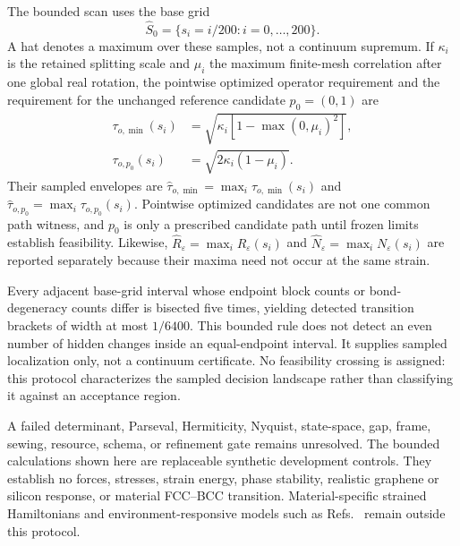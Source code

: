 \documentclass[11pt]{article}
\newenvironment{prospective}{\color{prospectivered}}{}
\begin{document}
The bounded scan uses the base grid
\begin{equation}
 \widehat S_0=\{s_i=i/200:i=0,\ldots,200\}.
 \label{eq:strain-scan-grid}
\end{equation}
A hat denotes a maximum over these samples, not a continuum supremum. If $\kappa_i$ is
the retained splitting scale and $\mu_i$ the maximum finite-mesh correlation after one
global real rotation, the pointwise optimized operator requirement and the requirement
for the unchanged reference candidate $p_0=(0,1)$ are
\begin{align}
 \tau_{o,\min}(s_i)
 &=\sqrt{\kappa_i[1-\max(0,\mu_i)^2]},\\
 \tau_{o,p_0}(s_i)
 &=\sqrt{2\kappa_i(1-\mu_i)}.
 \label{eq:strain-scan-witness-requirements}
\end{align}
Their sampled envelopes are $\widehat\tau_{o,\min}=\max_i\tau_{o,\min}(s_i)$ and
$\widehat\tau_{o,p_0}=\max_i\tau_{o,p_0}(s_i)$. Pointwise optimized candidates are not
one common path witness, and $p_0$ is only a prescribed candidate path until frozen
limits establish feasibility. Likewise,
$\widehat R_\varepsilon=\max_iR_\varepsilon(s_i)$ and
$\widehat N_\varepsilon=\max_iN_\varepsilon(s_i)$ are reported separately because their
maxima need not occur at the same strain.

Every adjacent base-grid interval whose endpoint block counts or bond-degeneracy counts
differ is bisected five times, yielding detected transition brackets of width at most
$1/6400$. This bounded rule does not detect an even number of hidden changes inside an
equal-endpoint interval. It supplies sampled localization only, not a continuum
certificate. No feasibility crossing is assigned: this protocol characterizes the sampled decision
landscape rather than classifying it against an acceptance region.

\begin{prospective}
A failed determinant, Parseval, Hermiticity, Nyquist, state-space, gap, frame, sewing,
resource, schema, or refinement gate remains unresolved. The bounded calculations shown
here are replaceable synthetic development controls. They establish no forces, stresses,
strain energy, phase stability, realistic graphene or silicon response, or material
FCC--BCC transition. Material-specific strained Hamiltonians and environment-responsive
models such as Refs.~\cite{Fang2018Strained2D,Zhang2022EquivariantHamiltonians} remain
outside this protocol.
\end{prospective}
\end{document}
